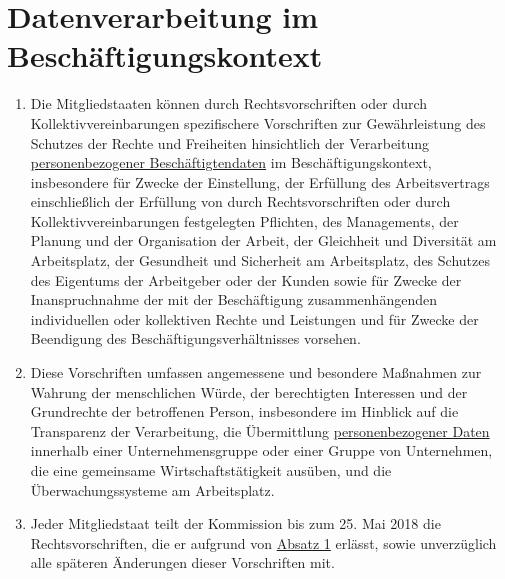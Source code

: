 \chapter{Datenverarbeitung im Beschäftigungskontext}
\label{ch:88}


\begin{enumerate}

  \item Die Mitgliedstaaten können durch Rechtsvorschriften oder durch Kollektivvereinbarungen spezifischere
   Vorschriften zur Gewährleistung des Schutzes der Rechte und Freiheiten hinsichtlich der Verarbeitung
   \hyperref[itm:04-1]{personenbezogener Beschäftigtendaten} im Beschäftigungskontext, insbesondere für Zwecke der Einstellung, der
   Erfüllung des Arbeitsvertrags einschließlich der Erfüllung von durch Rechtsvorschriften oder durch
   Kollektivvereinbarungen festgelegten Pflichten, des Managements, der Planung und der Organisation der Arbeit, der
   Gleichheit und Diversität am Arbeitsplatz, der Gesundheit und Sicherheit am Arbeitsplatz, des Schutzes des Eigentums
   der Arbeitgeber oder der Kunden sowie für Zwecke der Inanspruchnahme der mit der Beschäftigung zusammenhängenden
   individuellen oder kollektiven Rechte und Leistungen und für Zwecke der Beendigung des Beschäftigungsverhältnisses
   vorsehen.
  \label{itm:88-1}

  \item Diese Vorschriften umfassen angemessene und besondere Maßnahmen zur Wahrung der menschlichen Würde, der
   berechtigten Interessen und der Grundrechte der betroffenen Person, insbesondere im Hinblick auf die Transparenz der
   Verarbeitung, die Übermittlung \hyperref[itm:04-1]{personenbezogener Daten} innerhalb einer Unternehmensgruppe oder einer Gruppe von
   Unternehmen, die eine gemeinsame Wirtschaftstätigkeit ausüben, und die Überwachungssysteme am Arbeitsplatz.
  \label{itm:88-2}

  \item Jeder Mitgliedstaat teilt der Kommission bis zum 25. Mai 2018 die Rechtsvorschriften, die er aufgrund von
   \hyperref[itm:88-1]{Absatz 1} erlässt, sowie unverzüglich alle späteren Änderungen dieser Vorschriften mit.
  \label{itm:88-3}

\end{enumerate}


